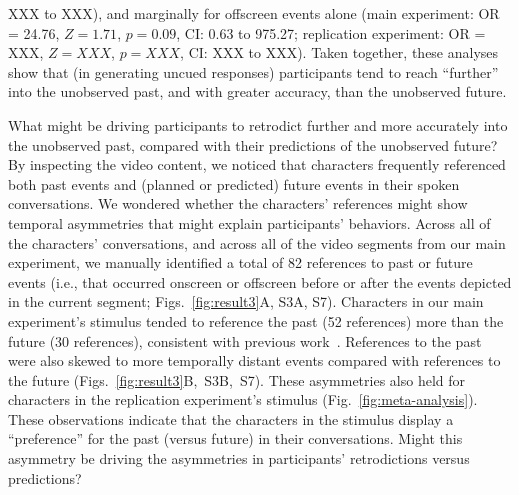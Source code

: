 \documentclass[10pt]{article}
\newcommand{\references}{S3}
\newcommand{\characterRefs}{S7}
\begin{document}
XXX to XXX), and marginally for offscreen events alone (main experiment: OR = 24.76, $Z = 1.71$, $p = 0.09$, CI: 0.63 to 975.27; replication experiment: OR = XXX, $Z = XXX$, $p = XXX$, CI: XXX to XXX). Taken together, these analyses show that (in generating uncued responses) participants tend to reach ``further'' into the unobserved past, and with greater accuracy, than the unobserved future.

What might be driving participants to retrodict further and more accurately into the unobserved past, compared with their predictions of the unobserved future? By inspecting the video content, we noticed that characters frequently referenced both past events and (planned or predicted) future events in their spoken conversations. We wondered whether the characters' references might show temporal asymmetries that might explain participants' behaviors. Across all of the characters' conversations, and across all of the video segments from our main experiment, we manually identified a total of 82 references to past or future events (i.e., that occurred onscreen or offscreen before or after the events depicted in the current segment; Figs.~\ref{fig:result3}A, \references A, \characterRefs). Characters in our main experiment's stimulus tended to reference the past (52 references) more than the future (30 references), consistent with previous work~\citep{DemiEtal18}. References to the past were also skewed to more temporally distant events compared with references to the future (Figs.~\ref{fig:result3}B,~\references B,~\characterRefs). These asymmetries also held for characters in the replication experiment's stimulus (Fig.~\ref{fig:meta-analysis}). These observations indicate that the characters in the stimulus display a ``preference'' for the past (versus future) in their conversations. Might this asymmetry be driving the asymmetries in participants' retrodictions versus predictions?
\end{document}
